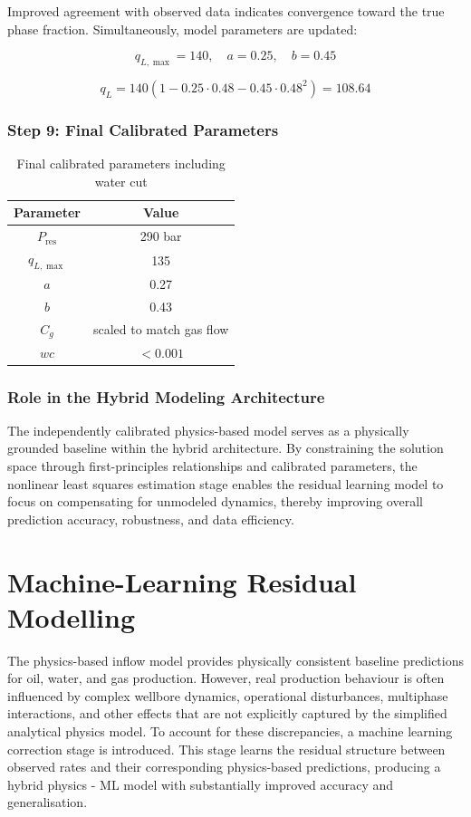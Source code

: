 \documentclass[12pt,APA]{uomthesis}
\begin{document}
Improved agreement with observed data indicates convergence toward the true phase fraction. Simultaneously, model parameters are updated:

\[
q_{L,\max} = 140, \quad a = 0.25, \quad b = 0.45
\]

\[
q_L = 140 \left(1 - 0.25 \cdot 0.48 - 0.45 \cdot 0.48^2 \right)
= 108.64
\]


\subsubsection*{Step 9: Final Calibrated Parameters}
\begin{table}[!htb]
\centering
\begin{tabular}{cc}
\hline
Parameter & Value \\
\hline
$P_{\text{res}}$ & 290 bar \\
$q_{L,\max}$ & 135 \\
$a$ & 0.27 \\
$b$ & 0.43 \\
$C_g$ & scaled to match gas flow \\
$wc$ & $< 0.001$ \\
\hline
\end{tabular}
\caption{Final calibrated parameters including water cut}
\end{table}

\subsubsection{Role in the Hybrid Modeling Architecture}
The independently calibrated physics-based model serves as a physically grounded baseline within the hybrid architecture. By constraining the solution space through first-principles relationships and calibrated parameters, the nonlinear least squares estimation stage enables the residual learning model to focus on compensating for unmodeled dynamics, thereby improving overall prediction accuracy, robustness, and data efficiency.

\section{Machine-Learning Residual Modelling}
\label{sec:residual_ml}
The physics-based inflow model provides physically consistent baseline predictions for oil,
water, and gas production. However, real production behaviour is often influenced by
complex wellbore dynamics, operational disturbances, multiphase interactions, and other
effects that are not explicitly captured by the simplified analytical physics model.
To account for these discrepancies, a machine learning correction stage is introduced.
This stage learns the residual structure between observed rates and their corresponding
physics-based predictions, producing a hybrid physics - ML model with substantially improved
accuracy and generalisation.
\end{document}
